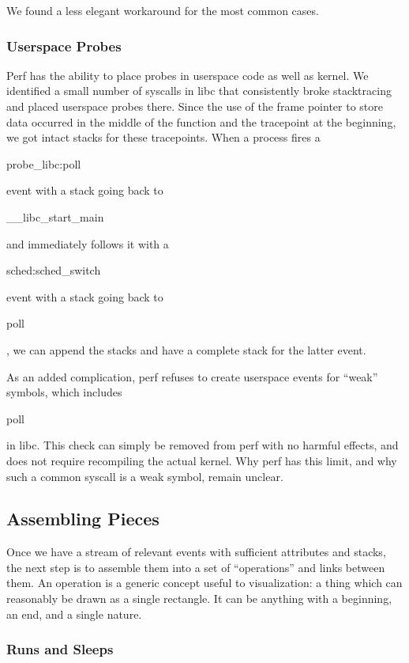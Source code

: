 \documentclass[10pt]{article}
\begin{document}
We found a less elegant workaround for the most common cases.

\subsubsection{Userspace Probes}

Perf has the ability to place probes in userspace code as well as kernel.  We identified a small number of syscalls in libc that consistently broke stacktracing and placed userspace probes there.  Since the use of the frame pointer to store data occurred in the middle of the function and the tracepoint at the beginning, we got intact stacks for these tracepoints.  When a process fires a \begin{tt}probe\_libc:poll\end{tt} event with a stack going back to \begin{tt}\_\_libc\_start\_main\end{tt} and immediately follows it with a \begin{tt}sched:sched\_switch\end{tt} event with a stack going back to \begin{tt}poll\end{tt}, we can append the stacks and have a complete stack for the latter event.

As an added complication, perf refuses to create userspace events for ``weak'' symbols, which includes \begin{tt}poll\end{tt} in libc.  This check can simply be removed from perf with no harmful effects, and does not require recompiling the actual kernel.  Why perf has this limit, and why such a common syscall is a weak symbol, remain unclear.

\subsection{Assembling Pieces}

Once we have a stream of relevant events with sufficient attributes and stacks, the next step is to assemble them into a set of ``operations'' and links between them.  An operation is a generic concept useful to visualization: a thing which can reasonably be drawn as a single rectangle.  It can be anything with a beginning, an end, and a single nature.

\subsubsection{Runs and Sleeps}
\end{document}
